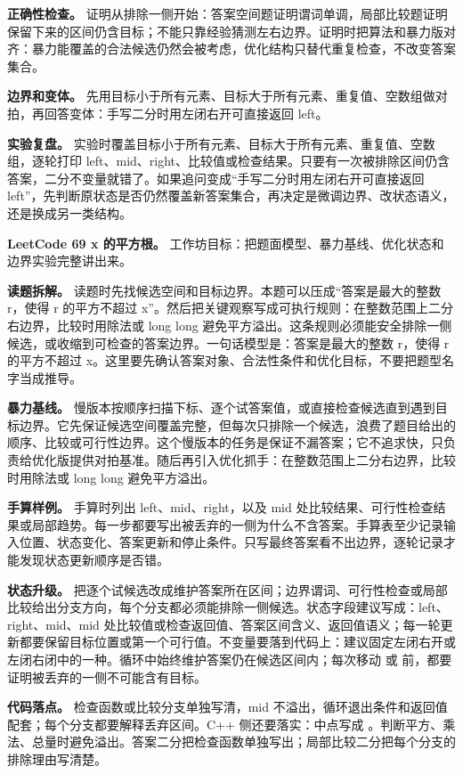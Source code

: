 \textbf{正确性检查。} 证明从排除一侧开始：答案空间题证明谓词单调，局部比较题证明保留下来的区间仍含目标；不能只靠经验猜测左右边界。证明时把算法和暴力版对齐：暴力能覆盖的合法候选仍然会被考虑，优化结构只替代重复检查，不改变答案集合。

\textbf{边界和变体。} 先用目标小于所有元素、目标大于所有元素、重复值、空数组做对拍，再回答变体：手写二分时用左闭右开可直接返回 left。

\textbf{实验复盘。} 实验时覆盖目标小于所有元素、目标大于所有元素、重复值、空数组，逐轮打印 left、mid、right、比较值或检查结果。只要有一次被排除区间仍含答案，二分不变量就错了。如果追问变成“手写二分时用左闭右开可直接返回 left”，先判断原状态是否仍然覆盖新答案集合，再决定是微调边界、改状态语义，还是换成另一类结构。

\noindent\textbf{LeetCode 69 x 的平方根。} 工作坊目标：把题面模型、暴力基线、优化状态和边界实验完整讲出来。

\textbf{读题拆解。} 读题时先找候选空间和目标边界。本题可以压成“答案是最大的整数 r，使得 r 的平方不超过 x”。然后把关键观察写成可执行规则：在整数范围上二分右边界，比较时用除法或 long long 避免平方溢出。这条规则必须能安全排除一侧候选，或收缩到可检查的答案边界。一句话模型是：答案是最大的整数 r，使得 r 的平方不超过 x。这里要先确认答案对象、合法性条件和优化目标，不要把题型名字当成推导。

\textbf{暴力基线。} 慢版本按顺序扫描下标、逐个试答案值，或直接检查候选直到遇到目标边界。它先保证候选空间覆盖完整，但每次只排除一个候选，浪费了题目给出的顺序、比较或可行性边界。这个慢版本的任务是保证不漏答案；它不追求快，只负责给优化版提供对拍基准。随后再引入优化抓手：在整数范围上二分右边界，比较时用除法或 long long 避免平方溢出。

\textbf{手算样例。} 手算时列出 left、mid、right，以及 mid 处比较结果、可行性检查结果或局部趋势。每一步都要写出被丢弃的一侧为什么不含答案。手算表至少记录输入位置、状态变化、答案更新和停止条件。只写最终答案看不出边界，逐轮记录才能发现状态更新顺序是否错。

\textbf{状态升级。} 把逐个试候选改成维护答案所在区间；边界谓词、可行性检查或局部比较给出分支方向，每个分支都必须能排除一侧候选。状态字段建议写成：left、right、mid、mid 处比较值或检查返回值、答案区间含义、返回值语义；每一轮更新都要保留目标位置或第一个可行值。不变量要落到代码上：建议固定左闭右开或左闭右闭中的一种。循环中始终维护答案仍在候选区间内；每次移动  或  前，都要证明被丢弃的一侧不可能含有目标。

\textbf{代码落点。} 检查函数或比较分支单独写清，mid 不溢出，循环退出条件和返回值配套；每个分支都要解释丢弃区间。C++ 侧还要落实：中点写成 。判断平方、乘法、总量时避免溢出。答案二分把检查函数单独写出；局部比较二分把每个分支的排除理由写清楚。

